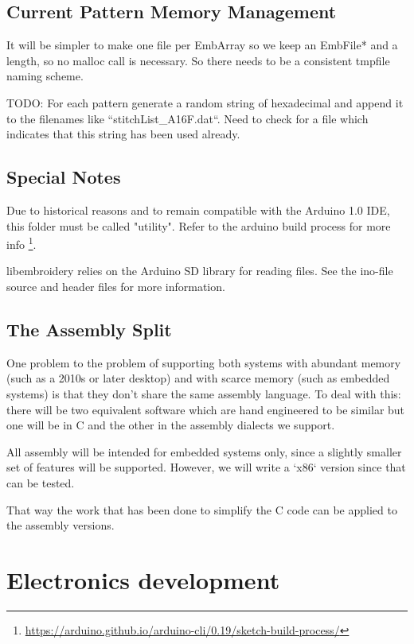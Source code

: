 \documentclass[11pt]{report}
\begin{document}
\section{Current Pattern Memory Management}

It will be simpler to make one file per EmbArray so we keep an EmbFile*
and a length, so no malloc call is necessary. So there needs to be a consistent
tmpfile naming scheme.

TODO: For each pattern generate a random string of hexadecimal and append it
to the filenames like ``stitchList\_A16F.dat``. Need to check for a file
which indicates that this string has been used already.

\section{Special Notes}

Due to historical reasons and to remain compatible with the Arduino 1.0
IDE, this folder must be called "utility". Refer to the arduino build
process for more info
\footnote{\url{https://arduino.github.io/arduino-cli/0.19/sketch-build-process/}}.

libembroidery relies on the Arduino SD library for reading files. See
the ino-file source and header files for more information.

\section{The Assembly Split}

One problem to the problem of supporting both systems with abundant memory
(such as a 2010s or later desktop) and with scarce memory (such as embedded
systems) is that they don't share the same assembly language. To deal with
this: there will be two equivalent software which are hand engineered to be
similar but one will be in C and the other in the assembly dialects we support.

All assembly will be intended for embedded systems only, since a slightly
smaller set of features will be supported. However, we will write a
`x86` version since that can be tested.

That way the work that has been done to simplify the C code can be applied
to the assembly versions.

\chapter{Electronics development}
\end{document}
